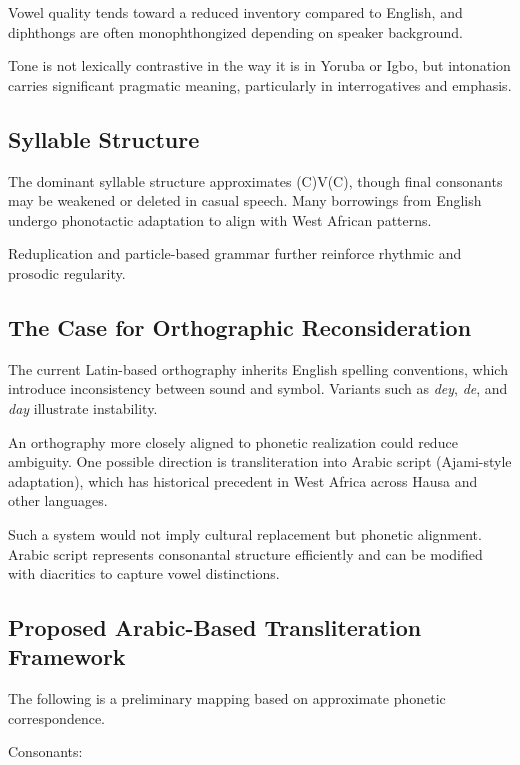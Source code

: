 \documentclass[12pt]{article}
\begin{document}
Vowel quality tends toward a reduced inventory compared to English, and diphthongs are often monophthongized depending on speaker background.

Tone is not lexically contrastive in the way it is in Yoruba or Igbo, but intonation carries significant pragmatic meaning, particularly in interrogatives and emphasis.

\subsection{Syllable Structure}

The dominant syllable structure approximates (C)V(C), though final consonants may be weakened or deleted in casual speech. Many borrowings from English undergo phonotactic adaptation to align with West African patterns.

Reduplication and particle-based grammar further reinforce rhythmic and prosodic regularity.

\subsection{The Case for Orthographic Reconsideration}

The current Latin-based orthography inherits English spelling conventions, which introduce inconsistency between sound and symbol. Variants such as \textit{dey}, \textit{de}, and \textit{day} illustrate instability.

An orthography more closely aligned to phonetic realization could reduce ambiguity. One possible direction is transliteration into Arabic script (Ajami-style adaptation), which has historical precedent in West Africa across Hausa and other languages.

Such a system would not imply cultural replacement but phonetic alignment. Arabic script represents consonantal structure efficiently and can be modified with diacritics to capture vowel distinctions.

\subsection{Proposed Arabic-Based Transliteration Framework}

The following is a preliminary mapping based on approximate phonetic correspondence.

Consonants:
\end{document}
